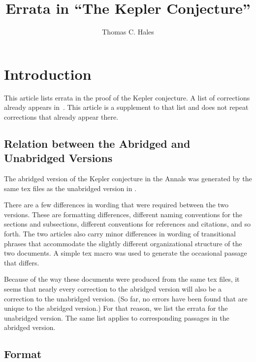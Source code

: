 \documentclass[11pt]{amsart}
\begin{document}
\title{Errata in ``The Kepler Conjecture''}

\author{Thomas C. Hales}

\address{Math Department, University of Pittsburgh}


\maketitle

\section{Introduction}

This article lists errata in the proof of the Kepler
conjecture.  A list of corrections already appears in~\cite{RKC}.
This article is a supplement to that list and does not repeat
corrections that already appear there.


\subsection{Relation between the Abridged and Unabridged Versions}

The abridged version of the Kepler conjecture
in the Annals \cite{A}
was generated by the same tex
files as the unabridged version in \cite{DCG}.


There are a few differences in wording that
were required between the two versions.
These are formatting
differences, different naming
conventions for the sections and subsections,
different conventions for references and citations,
and so forth.
The two articles also carry minor differences
in wording of transitional phrases that
accommodate the slightly different organizational
structure of the two documents.  A simple
tex macro was used to generate the occasional passage
that differs.

Because of the way these documents were produced
from the same tex files,
it seems that nearly every correction to
the abridged version will also be a correction to the unabridged version.
(So far, no errors have been found that are
unique to the abridged version.)
For that reason, we list the errata for the
unabridged version. The same list applies to corresponding 
passages in the abridged version.  




\subsection{Format}
\end{document}
